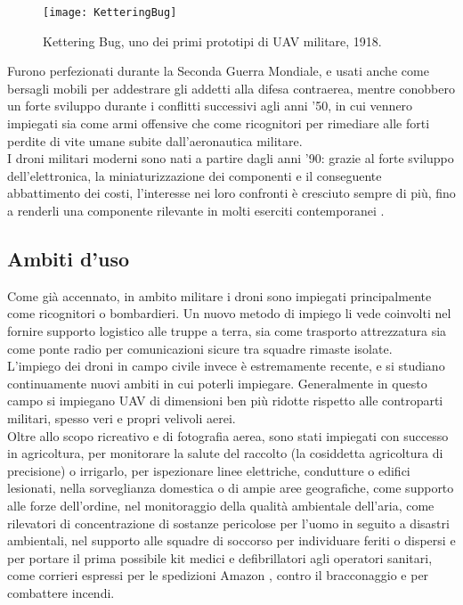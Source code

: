 \begin{wrapfigure}{r}{0.5\textwidth}
	\begin{center}
		\texttt{[image: KetteringBug]}
	\end{center}
	\caption{Kettering Bug, uno dei primi prototipi di UAV militare, 1918.} \label{fig:Kettering_Bug}
\end{wrapfigure}

Furono perfezionati durante la Seconda Guerra Mondiale, e usati anche come bersagli mobili per addestrare gli addetti alla difesa contraerea, mentre conobbero un forte sviluppo durante i conflitti successivi agli anni '50, in cui vennero impiegati sia come armi offensive che come ricognitori per rimediare alle forti perdite di vite umane subite dall'aeronautica militare.  \\
I droni militari moderni sono nati a partire dagli anni '90: grazie al forte sviluppo dell'elettronica, la miniaturizzazione dei componenti e il conseguente abbattimento dei costi, l'interesse nei loro confronti è cresciuto sempre di più, fino a renderli una componente rilevante in molti eserciti contemporanei \cite{keane2013brief}.

\subsection[Ambiti d'uso]{Ambiti d'uso}
Come già accennato, in ambito militare i droni sono impiegati principalmente come ricognitori o bombardieri. 
Un nuovo metodo di impiego li vede coinvolti nel fornire supporto logistico alle truppe a terra, sia come trasporto attrezzatura sia come ponte radio per comunicazioni sicure tra squadre rimaste isolate. \\
L'impiego dei droni in campo civile invece è estremamente recente, e si studiano continuamente nuovi ambiti in cui poterli impiegare. 
Generalmente in questo campo si impiegano UAV di dimensioni ben più ridotte rispetto alle controparti militari, spesso veri e propri velivoli aerei. \\
Oltre allo scopo ricreativo e di fotografia aerea, sono stati impiegati con successo in agricoltura, per monitorare la salute del raccolto (la cosiddetta agricoltura di precisione) o irrigarlo, per ispezionare linee elettriche, condutture o edifici lesionati, nella sorveglianza domestica o di ampie aree geografiche, come supporto alle forze dell'ordine, nel monitoraggio della qualità ambientale dell'aria, come rilevatori di concentrazione di sostanze pericolose per l'uomo in seguito a disastri ambientali, nel supporto alle squadre di soccorso per individuare feriti o dispersi e per portare il prima possibile kit medici e defibrillatori agli operatori sanitari, come corrieri espressi per le spedizioni Amazon \cite{amazon}, contro il bracconaggio e per combattere incendi. \cite{dronespeak} 

